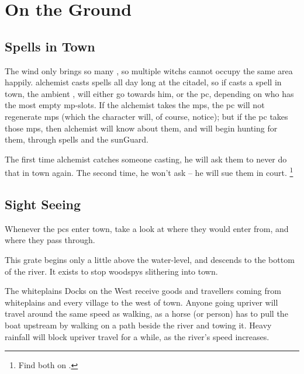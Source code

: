 \section{On the Ground}

\townMap

\begin{multicols}{2}

\subsection{Spells in Town}

The wind only brings so many , so multiple \glspl{witch} cannot occupy the same area happily.
\Gls{alchemist} casts spells all day long at the citadel, so if  casts a spell in town, the ambient , will either go towards him, or the \gls{pc}, depending on who has the most empty \gls{mp}-slots.
If the \gls{alchemist} takes the \glspl{mp}, the \gls{pc} will not regenerate \glspl{mp} (which the character will, of course, notice); but if the \gls{pc} takes those \glspl{mp}, then \gls{alchemist} will know about them, and will begin hunting for them, through spells and the \gls{sunGuard}.

The first time \gls{alchemist} catches someone \gls{casting}, he will ask them to never do that in town again.
The second time, he won't ask -- he will sue them in \gls{court}.%
\footnote{Find both on .}

\subsection{Sight Seeing}

Whenever the \glspl{pc} enter \gls{town}, take a look at where they would enter from, and where they pass through.


This grate begins only a little above the water-level, and descends to the bottom of the river.
It exists to stop \glspl{woodspy}%
slithering into \gls{town}.


The \gls{whiteplains} Docks on the West receive goods and travellers coming from \gls{whiteplains} and every \gls{village} to the west of \gls{town}.
Anyone going upriver will travel around the same speed as walking, as a horse (or person) has to pull the boat upstream by walking on a path beside the river and towing it.
Heavy rainfall will block upriver travel for a while, as the river's speed increases.


\end{multicols}
